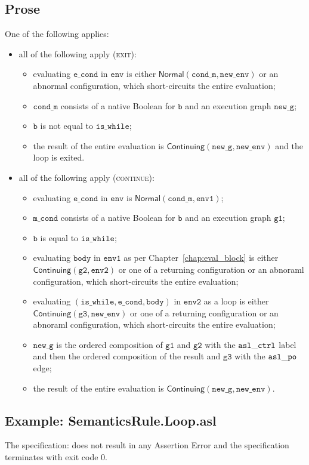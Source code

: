 \documentclass{book}
\newcommand\ProseOrAbnormal[0]{or an abnormal configuration, which short-circuits the entire evaluation}
\newcommand\Normal[0]{\textsf{Normal}}
\newcommand\Continuing[0]{\textsf{Continuing}}
\newcommand\newenv[0]{\texttt{new\_env}}
\newcommand\env[0]{\texttt{env}}
\newcommand\envone[0]{\texttt{env1}}
\newcommand\envtwo[0]{\texttt{env2}}
\newcommand\newg[0]{\texttt{new\_g}}
\newcommand\vgone[0]{\texttt{g1}}
\newcommand\vgtwo[0]{\texttt{g2}}
\newcommand\vgthree[0]{\texttt{g3}}
\newcommand\mcond[0]{\texttt{m\_cond}}
\newcommand\vbody[0]{\texttt{body}}
\newcommand\iswhile[0]{\texttt{is\_while}}
\newcommand\econd[0]{\texttt{e\_cond}}
\newcommand\condm[0]{\texttt{cond\_m}}
\newcommand\vb[0]{\texttt{b}}
\begin{document}
\subsection{Prose}
One of the following applies:
\begin{itemize}
\item all of the following apply (\textsc{exit}):
  \begin{itemize}
    \item evaluating $\econd$ in $\env$ is either $\Normal(\condm, \newenv)$ \ProseOrAbnormal;
    \item $\condm$ consists of a native Boolean for $\vb$ and an execution graph $\newg$;
    \item $\vb$ is not equal to $\iswhile$;
    \item the result of the entire evaluation is $\Continuing(\newg, \newenv)$
    and the loop is exited.
  \end{itemize}
\item all of the following apply (\textsc{continue}):
  \begin{itemize}
    \item evaluating $\econd$ in $\env$ is $\Normal(\condm, \envone)$;
    \item $\mcond$ consists of a native Boolean for $\vb$ and an execution graph $\vgone$;
    \item $\vb$ is equal to $\iswhile$;
    \item evaluating $\vbody$ in $\envone$ as per Chapter~\ref{chap:eval_block} is either
    $\Continuing(\vgtwo, \envtwo)$ or one of a returning configuration or an abnoraml
    configuration, which short-circuits the entire evaluation;
    \item evaluating $(\iswhile, \econd, \vbody)$ in $\envtwo$ as a loop is either \\
    $\Continuing(\vgthree, \newenv)$ or one of a returning configuration or an abnoraml
    configuration, which short-circuits the entire evaluation;
    \item $\newg$ is the ordered composition of $\vgone$ and $\vgtwo$ with the $\mathtt{asl\_ctrl}$ label
    and then the ordered composition of the result and $\vgthree$ with the $\mathtt{asl\_po}$ edge;
    \item the result of the entire evaluation is $\Continuing(\newg, \newenv)$.
  \end{itemize}
\end{itemize}

    \subsection{Example: SemanticsRule.Loop.asl}
    The specification:
    does not result in any Assertion Error and the specification terminates with exit
    code $0$.
\end{document}
